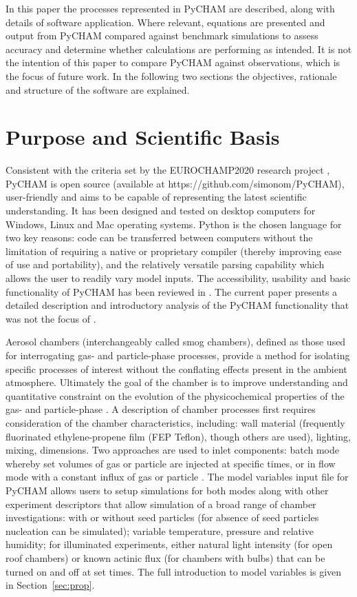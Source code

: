 \documentclass[gmd, manuscript]{copernicus}
\begin{document}
In this paper the processes represented in PyCHAM are described, along with details of software application.  Where relevant, equations are presented and output from PyCHAM compared against benchmark simulations to assess accuracy and determine whether calculations are performing as intended.  It is not the intention of this paper to compare PyCHAM against observations, which is the focus of future work.  In the following two sections the objectives, rationale and structure of the software are explained.


\section{Purpose and Scientific Basis}\label{sec:purp}

Consistent with the criteria set by the EUROCHAMP2020 research project \citep{EUROCHAMP2020}, PyCHAM is open source (available at https://github.com/simonom/PyCHAM), user-friendly and aims to be capable of representing the latest scientific understanding.  It has been designed and tested on desktop computers for Windows, Linux and Mac operating systems.  Python is the chosen language for two key reasons: code can be transferred between computers without the limitation of requiring a native or proprietary compiler (thereby improving ease of use and portability), and the relatively versatile parsing capability which allows the user to readily vary model inputs.  The accessibility, usability and basic functionality of PyCHAM has been reviewed in \citet{OMeara2020}.  The current paper presents a detailed description and introductory analysis of the PyCHAM functionality that was not the focus of \citet{OMeara2020}.

Aerosol chambers (interchangeably called smog chambers), defined as those used for interrogating gas- and particle-phase processes, provide a method for isolating specific processes of interest without the conflating effects present in the ambient atmosphere.  Ultimately the goal of the chamber is to improve understanding and quantitative constraint on the evolution of the physicochemical properties of the gas- and particle-phase \citep{Schwantes2017, Charan2019, Hidy2019}.  A description of chamber processes first requires consideration of the chamber characteristics, including: wall material (frequently fluorinated ethylene-propene film (FEP Teflon), though others are used), lighting, mixing, dimensions.  Two approaches are used to inlet components: batch mode whereby set volumes of gas or particle are injected at specific times, or in flow mode with a constant influx of gas or particle \citep{Jaoui2014}.  The model variables input file for PyCHAM allows users to setup simulations for both modes along with other experiment descriptors that allow simulation of a broad range of chamber investigations: with or without seed particles (for absence of seed particles nucleation can be simulated); variable temperature, pressure and relative humidity; for illuminated experiments, either natural light intensity (for open roof chambers) or known actinic flux (for chambers with bulbs) that can be turned on and off at set times.  The full introduction to model variables is given in Section~\ref{sec:prop}.
\end{document}
